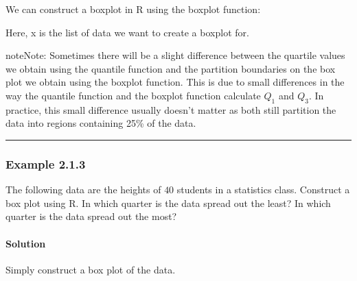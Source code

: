 \documentclass[letterpaper,10pt,english]{jupyterBook}
\begin{document}
\sphinxAtStartPar
We can construct a boxplot in R using the boxplot function:

\begin{sphinxVerbatim}[commandchars=\\\{\}]
\end{sphinxVerbatim}

\sphinxAtStartPar
Here, x is the list of data we want to create a boxplot for.

\begin{sphinxadmonition}{note}{Note:}
\sphinxAtStartPar
Sometimes there will be a slight difference between the quartile values we obtain using the quantile function and the partition boundaries on the box plot we obtain using the boxplot function. This is due to small differences in the way the quantile function and the boxplot function calculate \(Q_1\) and \(Q_3\). In practice, this small difference usually doesn’t matter as both still partition the data into regions containing  25\% of the data.
\end{sphinxadmonition}


\bigskip\hrule\bigskip



\subsubsection{Example 2.1.3}
\label{\detokenize{Ch2 Descriptive Statistics/2.1 Measures of Position:example-2-1-3}}
\sphinxAtStartPar
The following data are the heights of \(40\) students in a statistics class. Construct a box plot using R. In which quarter is the data spread out the least? In which quarter is the data spread out the most?




\paragraph{Solution}
\label{\detokenize{Ch2 Descriptive Statistics/2.1 Measures of Position:id2}}
\sphinxAtStartPar
Simply construct a box plot of the data.
\end{document}
